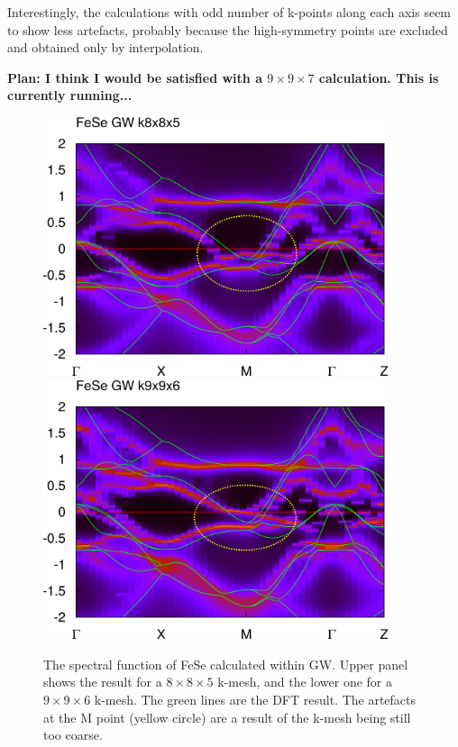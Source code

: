 \documentclass[12pt,a4paper]{scrartcl}
\numberwithin{equation}{section}
\begin{document}
Interestingly, the calculations with odd number of k-points
along each axis seem to show less artefacts, probably because the
high-symmetry points are excluded and obtained only by interpolation.

\textbf{Plan: I think I would be satisfied with a $9\times 9  \times 7$
calculation. This is currently running...}

\begin{figure}[h]
\includegraphics[width=0.9\textwidth]{figs/kmesh/FeSe/FeSe_bands_GW_k885.png}
\includegraphics[width=0.9\textwidth]{figs/kmesh/FeSe/FeSe_bands_GW_k996.png}

\caption{The spectral function of FeSe calculated within GW. Upper panel
shows the result for a $8\times 8\times 5$ k-mesh,
and the lower one for a $9\times 9\times 6$ k-mesh. 
The green lines are the DFT result. The artefacts at the M point (yellow circle)
are a result of the k-mesh being still too coarse.}
\label{fig:FeSe_GW_spec_comp}
\end{figure}
\end{document}
